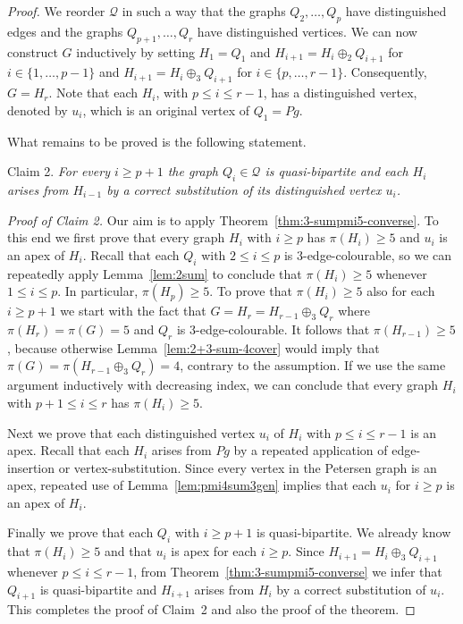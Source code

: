 \documentclass[10pt,a4paper]{amsart}
\begin{document}
\begin{proof}
We reorder $\mathcal{Q}$ in such a way that the graphs $Q_2,
\ldots, Q_p$ have distinguished edges and the graphs $Q_{p+1},
\ldots, Q_r$ have distinguished vertices. We can now construct
$G$ inductively by setting $H_1=Q_1$ and $H_{i+1}=H_i\oplus_2
Q_{i+1}$ for $i\in\{1,\ldots, p-1\}$ and $H_{i+1}=H_i\oplus_3
Q_{i+1}$ for $i\in\{p, \ldots, r-1\}$. Consequently, $G=H_r$.
Note that each $H_i$, with $p\le i\le r-1$, has a distinguished
vertex, denoted by $u_i$, which is an original vertex of
$Q_1=Pg$.

What remains to be proved is the following statement.

\medskip\noindent
Claim 2. \emph{For every $i\ge p+1$ the graph
$Q_i\in\mathcal{Q}$ is quasi-bipartite and each $H_i$ arises
from $H_{i-1}$ by a correct substitution of its distinguished
vertex $u_i$.}

\medskip\noindent
\emph{Proof of Claim 2.} Our aim is to apply
Theorem~\ref{thm:3-sumpmi5-converse}. To this end we first
prove that every graph $H_i$ with $i\ge p$ has $\pi(H_i)\ge 5$
and $u_i$ is an apex of $H_i$. Recall that each $Q_i$ with
$2\le i\le p$ is $3$-edge-colourable, so we can repeatedly
apply Lemma~\ref{lem:2sum} to conclude that $\pi(H_i)\ge 5$
whenever $1\le i \le p$. In particular, $\pi(H_p)\ge 5$. To
prove that $\pi(H_i)\ge 5$ also for each $i\ge p+1$ we start
with the fact that $G=H_r=H_{r-1}\oplus_3 Q_r$ where
$\pi(H_r)=\pi(G)=5$ and $Q_r$ is $3$-edge-colourable. It
follows that $\pi(H_{r-1})\ge 5$, because otherwise
Lemma~\ref{lem:2+3-sum-4cover} would imply that
$\pi(G)=\pi(H_{r-1}\oplus_3 Q_r)=4$, contrary to the
assumption. If we use the same argument inductively with
decreasing index, we can conclude that every graph $H_i$ with
$p+1\le i\le r$ has $\pi(H_i)\ge 5$.

Next we prove that each distinguished vertex $u_i$ of $H_i$
with $p\le i\le r-1$ is an apex. Recall that each $H_i$ arises
from $Pg$ by a repeated application of edge-insertion or
vertex-substitution. Since every vertex in the Petersen graph
is an apex, repeated use of Lemma~\ref{lem:pmi4sum3gen} implies
that each $u_i$ for $i\geq p$ is an apex of $H_i$.

Finally we prove that each $Q_i$ with $i\ge p+1$ is
quasi-bipartite. We already know that $\pi(H_i)\ge 5$ and that
$u_i$ is apex for each $i\ge p$. Since $H_{i+1}=H_i\oplus_3
Q_{i+1}$ whenever $p\le i\le r-1$, from
Theorem~\ref{thm:3-sumpmi5-converse} we infer that $Q_{i+1}$ is
quasi-bipartite and $H_{i+1}$ arises from $H_i$ by a correct
substitution of $u_i$. This completes the proof of Claim~2 and
also the proof of the theorem.
\end{proof}
\end{document}
